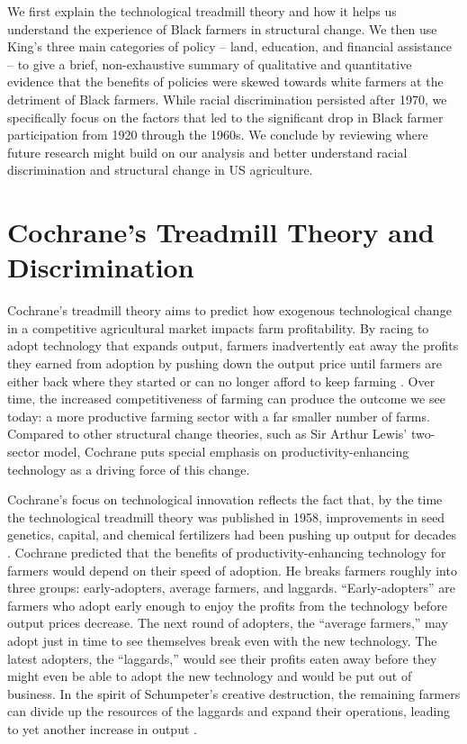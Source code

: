 \documentclass[12pt]{article}
\begin{document}
We first explain the technological treadmill theory and how it helps us understand the experience of Black farmers in structural change. We then use King’s three main categories of policy – land, education, and financial assistance – to give a brief, non-exhaustive summary of qualitative and quantitative evidence that the benefits of policies were skewed towards white farmers at the detriment of Black farmers. While racial discrimination persisted after 1970, we specifically focus on the factors that led to the significant drop in Black farmer participation from 1920 through the 1960s. We conclude by reviewing where future research might build on our analysis and better understand racial discrimination and structural change in US agriculture.


\section*{Cochrane’s Treadmill Theory and Discrimination}
Cochrane’s treadmill theory aims to predict how exogenous technological change in a competitive agricultural market impacts farm profitability.
By racing to adopt technology that expands output, farmers inadvertently eat away the profits they earned from adoption by pushing down the output price until farmers are either back where they started or can no longer afford to keep farming \citep{cochrane_farm_1958}.
Over time, the increased competitiveness of farming can produce the outcome we see today: a more productive farming sector with a far smaller number of farms.
Compared to other structural change theories, such as Sir Arthur Lewis' two-sector model, Cochrane puts special emphasis on productivity-enhancing technology as a driving force of this change.

Cochrane's focus on technological innovation reflects the fact that, by the time the technological treadmill theory was published in 1958, improvements in seed genetics, capital, and chemical fertilizers had been pushing up output for decades \citep{mundlak_economic_2005}.
Cochrane predicted that the benefits of productivity-enhancing technology for farmers would depend on their speed of adoption.
He breaks farmers roughly into three groups: early-adopters, average farmers, and laggards.
``Early-adopters'' are farmers who adopt early enough to enjoy the profits from the technology before output prices decrease.
The next round of adopters, the ``average farmers,'' may adopt just in time to see themselves break even with the new technology. 
The latest adopters, the ``laggards,'' would see their profits eaten away before they might even be able to adopt the new technology and would be put out of business.
In the spirit of Schumpeter’s creative destruction, the remaining farmers can divide up the resources of the laggards and expand their operations, leading to yet another increase in output \citep{cochrane_farm_1958}. 
\end{document}
